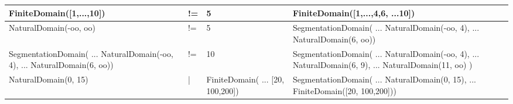 \begin{longtable}{ | p{6cm} | p{2cm}| p{3.5cm}| p{6.5cm}|  }
    FiniteDomain([1,...,10])          &
    !=                                &
    5                                 &
    FiniteDomain([1,...,4,6, ...10])                                                                    \\
    \hline
    NaturalDomain(-oo, oo)            &
    !=                                &
    5                                 &
    SegmentationDomain(\newline
    ... NaturalDomain(-oo, 4),\newline
    ... NaturalDomain(6, oo))                                                                           \\
    \hline
    SegmentationDomain(\newline
    ... NaturalDomain(-oo, 4), \newline
    ... NaturalDomain(6, oo))         &
    !=                                &
    10                                &
    SegmentationDomain(\newline
    ... NaturalDomain(-oo, 4),\newline
    ... NaturalDomain(6, 9), \newline
    ... NaturalDomain(11, oo) )                                                                         \\
    \hline
    NaturalDomain(0, 15)              &
    |                                 &
    FiniteDomain(\newline
    ... [20, 100,200])                &
    SegmentationDomain(\newline
    ... NaturalDomain(0, 15), \newline
    ... FiniteDomain([20, 100,200]))                                                                    \\

\end{longtable}
